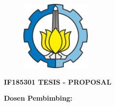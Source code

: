 \begin{flushleft}
    \color{white}

    \begin{figure}[h]
        \flushleft \raggedright
        \includegraphics[width = 3.5cm, height = 3.5cm]{src/resources/its-logo.png}
    \end{figure}

    \vspace{4.0cm}

    { \selectfont \large \bfseries \MakeUppercase
        IF185301 TESIS - PROPOSAL
    }

    \vspace{1.5cm}

    { \selectfont \Large \bfseries \MakeUppercase
        {\thetitle}
    }

    \vspace{1.5cm}

    \begin{singlespace}
   	    { \selectfont \large \bfseries \MakeUppercase
   	        {\theauthor}
        }
    \end{singlespace}

    \vspace{1.5cm}

    \begin{singlespace}
   	    { \selectfont \normalsize \bfseries
   	        Dosen Pembimbing: \\
                {\firstSupervisorName} \\
                {\secondSupervisorName}
        }
    \end{singlespace}

    \vspace{1.5cm}

    \begin{singlespace}
   	    { \selectfont
            \normalsize \bfseries \MakeUppercase {
                {\postgraduateDepartment} \\
                {\postgraduateFaculty} \\
                {\postgraduateUniversity} \\
                {\postgraduateYear}
            }
        }
    \end{singlespace}

\end{flushleft}

\restoregeometry

\clearpage
